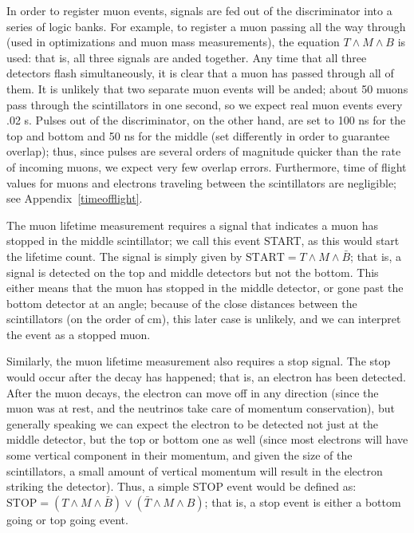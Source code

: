In order to register muon events, signals are fed out of the discriminator into a series of logic banks. For example, to register a muon passing all the way through (used in optimizations and muon mass measurements), the equation $T \wedge M \wedge B$ is used: that is, all three signals are anded together. Any time that all three detectors flash simultaneously, it is clear that a muon has passed through all of them. It is unlikely that two separate muon events will be anded; about 50 muons pass through the scintillators in one second, so we expect real muon events every .02 s. Pulses out of the discriminator, on the other hand, are set to 100 ns for the top and bottom and 50 ns for the middle (set differently in order to guarantee overlap); thus, since pulses are several orders of magnitude quicker than the rate of incoming muons, we expect very few overlap errors. Furthermore, time of flight values for muons and electrons traveling between the scintillators are negligible; see Appendix~\ref{timeofflight}.

The muon lifetime measurement requires a signal that indicates a muon has stopped in the middle scintillator; we call this event START, as this would start the lifetime count. The signal is simply given by $\mathrm{START} = T \wedge M \wedge \bar{B}$; that is, a signal is detected on the top and middle detectors but not the bottom. This either means that the muon has stopped in the middle detector, or gone past the bottom detector at an angle; because of the close distances between the scintillators (on the order of cm), this later case is unlikely, and we can interpret the event as a stopped muon.

Similarly, the muon lifetime measurement also requires a stop signal. The stop would occur after the decay has happened; that is, an electron has been detected. After the muon decays, the electron can move off in any direction (since the muon was at rest, and the neutrinos take care of momentum conservation), but generally speaking we can expect the electron to be detected not just at the middle detector, but the top or bottom one as well (since most electrons will have some vertical component in their momentum, and given the size of the scintillators, a small amount of vertical momentum will result in the electron striking the detector). Thus, a simple STOP event would be defined as: $\mathrm{STOP} = (T \wedge M \wedge \bar{B}) \vee (\bar{T} \wedge M \wedge B)$; that is, a stop event is either a bottom going or top going event.

